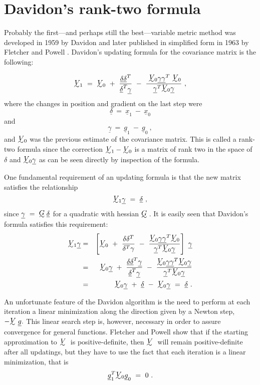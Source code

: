  
\section{Davidon's rank-two formula}
 
     Probably the first---and perhaps still the best---variable metric
method was developed in 1959 by Davidon and later published in simplified
form in 1963 by Fletcher and Powell \cite{Flet}.  Davidon's updating formula for
the covariance matrix is the following:
 
$$\UTV\!\!_1~=~\UTV\!\!_0~+~{{\underline{\delta}}{\underline{\delta}}^T\over {\underline{\delta}}^T
{\underline{\gamma}}}~-~{~\UTV\!\!_0{\underline{\gamma}}{\underline{\gamma}}^T~\UTV\!\!_0\over
 {\underline{\gamma}}^T\UTV\!\!_0{\underline{\gamma}}}~,$$
where the changes in position and gradient on the last step were
 $${\underline{\delta}}~=~{\underline{x}}_1~-~{\underline{x}}_0$$
and
$${\underline{\gamma}}~=~{\underline{g}}_1~-~{\underline{g}}_0~,$$
 and $\UTV\!\!_0$ was the previous estimate of the covariance matrix.  This is
called a rank-two formula since the correction $\UTV\!\!_1 - \UTV\!\!_0$ is a matrix of
rank two in the space of $\delta$ and $\UTV\!\!_0{\underline{\gamma}}$ as can be seen directly by
inspection of the formula.
 
     One fundamental requirement of an updating formula is that the new
matrix satisfies the relationship
 $$\UTV\!\!_1{\underline{\gamma}}~=~{\underline{\delta}}~,$$
since ${\underline{\gamma}}~=~\UTG{\underline{\delta}}$ for a quadratic with hessian $\UTG$. 
 It is easily seen that Davidon's formula satisfies this requirement:
\begin{eqnarray}
\UTV\!\!_1{\underline{\gamma}}&=&\left[\UTV\!\!_0~+~{\delta\delta^T\over \delta^T\gamma}~-~
{\UTV\!\!_0{\underline{\gamma}}{\underline{\gamma}}^T\UTV\!\!_0\over {\underline{\gamma}}^T 
\UTV\!\!_0{\underline{\gamma}}}\right]~{\underline{\gamma}}\nonumber \\
&=&\UTV\!\!_0{\underline{\gamma}}~+~{{\underline{\delta}}{\underline{\delta}}^T{\underline{\gamma}}
\over {\underline{\delta}}^T{\underline{\gamma}}}~-~
{\UTV\!\!_0{\underline{\gamma}}{\underline{\gamma}}^T\UTV\!\!_0{\underline{\gamma}}\over
{\underline{\gamma}}^T\UTV\!\!_0{\underline{\gamma}}}\nonumber \\
&=&\UTV\!\!_0{\underline{\gamma}}~+~
{\underline{\delta}}~-~\UTV\!\!_0{\underline{\gamma}}~=~
{\underline{\delta}}~.\nonumber
\end{eqnarray}
 
  An unfortunate feature of the Davidon algorithm is the need to
perform at each iteration a linear minimization along the direction
given by a Newton step, $-\UTV{\underline{g}}.$  This linear search step is, however,
necessary in order to assure convergence for general functions. Fletcher
and Powell show \cite{Flet} that if the starting approximation to $\UTV$ is
positive-definite, then
$\UTV$ will remain positive-definite after all updatings, but
they have to use the fact that each iteration is a linear minimization,
that is
$${\underline{g}}^T_1\UTV\!\!_0{\underline{g}}_0~=~0~.$$
 
